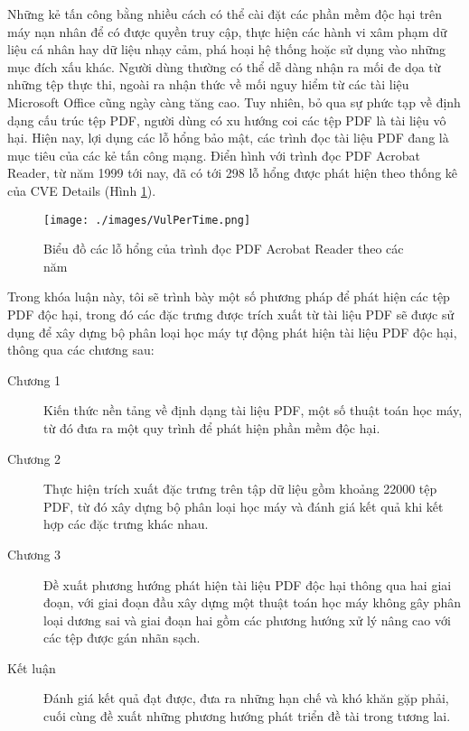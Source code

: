 \documentclass[./../main.tex]{subfiles}
\begin{document}
Những kẻ tấn công bằng nhiều cách có thể cài đặt các phần mềm độc hại trên máy nạn nhân để có được quyền truy cập, thực hiện các hành vi xâm phạm dữ liệu cá nhân hay dữ liệu nhạy cảm, phá hoại hệ thống hoặc sử dụng vào những mục đích xấu khác. Người dùng thường có thể dễ dàng nhận ra mối đe dọa từ những tệp thực thi, ngoài ra nhận thức về mối nguy hiểm từ các tài liệu Microsoft Office cũng ngày càng tăng cao. Tuy nhiên, bỏ qua sự phức tạp về định dạng cấu trúc tệp PDF, người dùng có xu hướng coi các tệp PDF là tài liệu vô hại.
Hiện nay, lợi dụng các lỗ hổng bảo mật, các trình đọc tài liệu PDF đang là mục tiêu của các kẻ tấn công mạng. Điển hình với trình đọc PDF Acrobat Reader, từ năm 1999 tới nay, đã có tới 298 lỗ hổng được phát hiện theo thống kê của CVE Details \footnotemark (Hình \ref{fig:acrobatcve}).

\begin{figure}[ht!]
	\texttt{[image: ./images/VulPerTime.png]}
	\caption{Biểu đồ các lỗ hổng của trình đọc PDF Acrobat Reader theo các năm\protect\footnotemark}
	\label{fig:acrobatcve}
\end{figure}

Trong khóa luận này, tôi sẽ trình bày một số phương pháp để phát hiện các tệp PDF độc hại, trong đó các đặc trưng được trích xuất từ tài liệu PDF sẽ được sử dụng để xây dựng bộ phân loại học máy tự động phát hiện tài liệu PDF độc hại, thông qua các chương sau:
\begin{description}
	\item [Chương 1] Kiến thức nền tảng về định dạng tài liệu PDF, một số thuật toán học máy, từ đó đưa ra một quy trình để phát hiện phần mềm độc hại.
	\item [Chương 2] Thực hiện trích xuất đặc trưng trên tập dữ liệu gồm khoảng 22000 tệp PDF, từ đó xây dựng bộ phân loại học máy và đánh giá kết quả khi kết hợp các đặc trưng khác nhau.
	\item [Chương 3] Đề xuất phương hướng phát hiện tài liệu PDF độc hại thông qua hai giai đoạn, với giai đoạn đầu xây dựng một thuật toán học máy không gây phân loại dương sai và giai đoạn hai gồm các phương hướng xử lý nâng cao với các tệp được gán nhãn sạch.
	\item [Kết luận] Đánh giá kết quả đạt được, đưa ra những hạn chế và khó khăn gặp phải, cuối cùng đề xuất những phương hướng phát triển đề tài trong tương lai.
\end{description}
\end{document}
